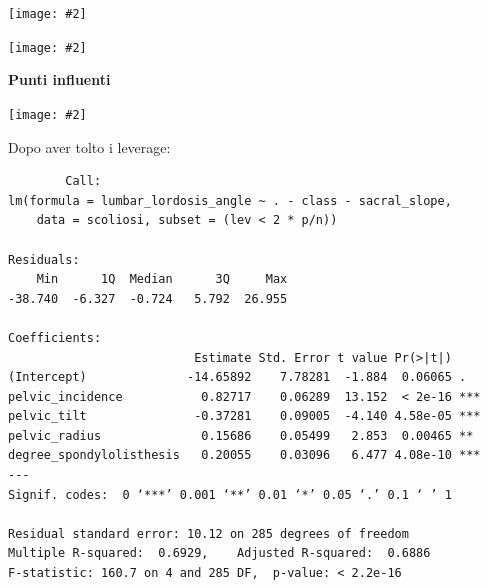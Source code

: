 \documentclass{beamer}
\newcommand{\fg}[2]{%
  \begin{center}
      \texttt{[image: \#2]}%
  \end{center}
}
\begin{document}
\begin{frame}
	\fg{0.8}{04residuistudentizzati}
\end{frame}


\begin{frame}
	\fg{0.6}{05graficone}
\end{frame}




\begin{frame}
	\textbf{Punti influenti}
	\fg{0.6}{06influencialPlot}
\end{frame}



\begin{frame}[fragile]
	Dopo aver tolto i leverage:

	{\tiny
	\begin{verbatim}
		Call:
lm(formula = lumbar_lordosis_angle ~ . - class - sacral_slope, 
    data = scoliosi, subset = (lev < 2 * p/n))

Residuals:
    Min      1Q  Median      3Q     Max 
-38.740  -6.327  -0.724   5.792  26.955 

Coefficients:
                          Estimate Std. Error t value Pr(>|t|)    
(Intercept)              -14.65892    7.78281  -1.884  0.06065 .  
pelvic_incidence           0.82717    0.06289  13.152  < 2e-16 ***
pelvic_tilt               -0.37281    0.09005  -4.140 4.58e-05 ***
pelvic_radius              0.15686    0.05499   2.853  0.00465 ** 
degree_spondylolisthesis   0.20055    0.03096   6.477 4.08e-10 ***
---
Signif. codes:  0 ‘***’ 0.001 ‘**’ 0.01 ‘*’ 0.05 ‘.’ 0.1 ‘ ’ 1

Residual standard error: 10.12 on 285 degrees of freedom
Multiple R-squared:  0.6929,	Adjusted R-squared:  0.6886 
F-statistic: 160.7 on 4 and 285 DF,  p-value: < 2.2e-16
	\end{verbatim}
	}
\end{frame}
\end{document}
